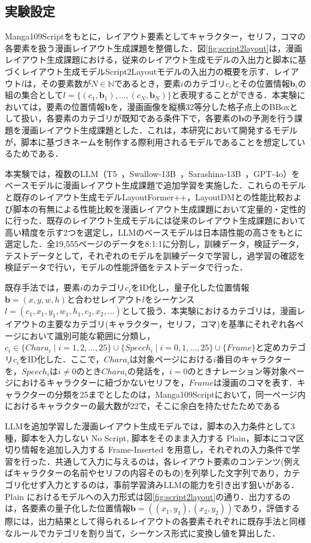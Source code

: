 \subsection{実験設定}
Manga109Scriptをもとに，レイアウト要素としてキャラクター，セリフ，コマの各要素を扱う漫画レイアウト生成課題を整備した．図\ref{fig:script2layout}は，漫画レイアウト生成課題における，従来のレイアウト生成モデルの入出力と脚本に基づくレイアウト生成モデルScript2Layoutモデルの入出力の概要を示す．レイアウト$l$は，その要素数が$N \in \mathbb{N}$であるとき，要素$i$のカテゴリ$c_i$とその位置情報$\mathbf{b}_i$の組の集合として$l = \{(c_1, \mathbf{b}_1), \dots, (c_N, \mathbf{b}_N)\}$と表現することができる．本実験においては，要素の位置情報$\mathbf{b}$を，漫画画像を縦横32等分した格子点上のBBoxとして扱い，各要素のカテゴリが既知である条件下で，各要素の$\mathbf{b}$の予測を行う課題を漫画レイアウト生成課題とした．これは，本研究において開発するモデルが，脚本に基づきネームを制作する際利用されるモデルであることを想定しているためである．

本実験では，複数のLLM（T5~\cite{t5}，Swallow-13B~\cite{swallow}，Sarashina-13B~\cite{sarashina}，GPT-4o）をベースモデルに漫画レイアウト生成課題で追加学習を実施した．これらのモデルと既存のレイアウト生成モデルLayoutFormer++，LayoutDMとの性能比較および脚本の有無による性能比較を漫画レイアウト生成課題において定量的・定性的に行った．既存のレイアウト生成モデルには従来のレイアウト生成課題において高い精度を示す2つを選定し，LLMのベースモデルは日本語性能の高さをもとに選定した．全19,555ページのデータを8:1:1に分割し，訓練データ，検証データ，テストデータとして，それぞれのモデルを訓練データで学習し，過学習の確認を検証データで行い，モデルの性能評価をテストデータで行った．

既存手法では，要素$i$のカテゴリ$c_i$をID化し，量子化した位置情報$\mathbf{b}=(x, y, w, h)$と合わせレイアウト$l$をシーケンス$l=(c_1, x_1, y_1, w_1, h_1, c_2, x_2, \dots)$として扱う．本実験におけるカテゴリは，漫画レイアウトの主要なカテゴリ(キャラクター，セリフ，コマ)を基準にそれぞれ各ページにおいて識別可能な範囲に分類し，$c_i \in \{Chara_i \mid i=1, 2, \dots, 25\} \cup \{Speech_i \mid i=0, 1, \dots, 25\} \cup \{Frame\}$と定めカテゴリ$c_i$をID化した．ここで，$Chara_i$は対象ページにおける$i$番目のキャラクターを，$Speech_i$は$i \neq 0$のとき$Chara_i$の発話を，$i = 0$のときナレーション等対象ページにおけるキャラクターに紐づかないセリフを，$Frame$は漫画のコマを表す．キャラクターの分類を25までとしたのは，Manga109Scriptにおいて，同一ページ内におけるキャラクターの最大数が22で，そこに余白を持たせたためである

LLMを追加学習した漫画レイアウト生成モデルでは，脚本の入力条件として3種，脚本を入力しない No Script, 脚本をそのまま入力する Plain，脚本にコマ区切り情報を追加し入力する Frame-Inserted を用意し，それぞれの入力条件で学習を行った．共通して入力に与えるのは，各レイアウト要素のコンテンツ(例えばキャラクターの名前やセリフの内容そのもの)を列挙した文字列であり，カテゴリ化せず入力とするのは，事前学習済みLLMの能力を引き出す狙いがある．Plain におけるモデルへの入力形式は図\ref{fig:script2layout}の通り．出力するのは，各要素の量子化した位置情報$\mathbf{b}=((x_1 , y_1), (x_2, y_2))$であり，評価する際には，出力結果として得られるレイアウトの各要素それぞれに既存手法と同様なルールでカテゴリを割り当て，シーケンス形式に変換し値を算出した．

